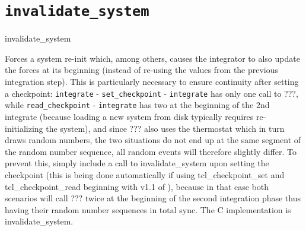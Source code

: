 \section{\texttt{invalidate_system}}
\begin{essyntax}
  invalidate_system
\end{essyntax}

Forces a system re-init which, among others, causes the integrator to
also update the forces at its beginning (instead of re-using the
values from the previous integration step).  This is particularly
necessary to ensure continuity after setting a checkpoint:
\texttt{integrate} - \texttt{set_checkpoint} - \texttt{integrate} has
only one call to ???, while \texttt{read_checkpoint} -
\texttt{integrate} has two at the beginning of the 2nd integrate
(because loading a new system from disk typically requires
re-initializing the system), and since ??? also uses the thermostat
which in turn draws random numbers, the two situations do not end up
at the same segment of the random number sequence, all random events
will therefore slightly differ.  To prevent this, simply include a
call to invalidate_system upon setting the checkpoint (this is being
done automatically if using tcl_checkpoint_set and
tcl_checkpoint_read beginning with v1.1 of \es{}), because in that
case both scenarios will call ??? twice at the beginning of the second
integration phase thus having their random number sequences in total
sync. The C implementation is invalidate_system.



